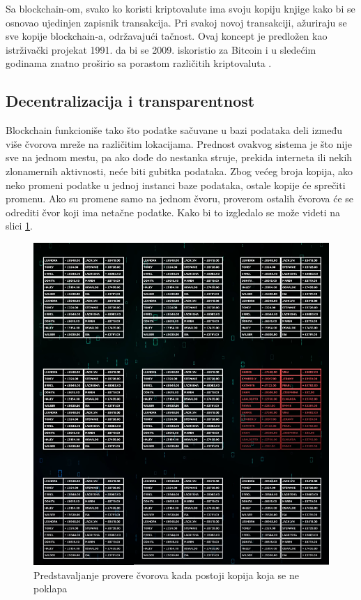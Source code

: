 \documentclass[a4paper]{article}
\begin{document}
{Sa blockchain-om, svako ko koristi kriptovalute ima svoju kopiju knjige kako bi se osnovao ujedinjen zapisnik transakcija. Pri svakoj novoj transakciji, ažuriraju se sve kopije blockchain-a, održavajući tačnost.\cite{kriptovalute2} Ovaj koncept je predložen kao istrživački projekat 1991. da bi se 2009. iskoristio za Bitcoin i u sledećim godinama znatno proširio sa porastom različitih kriptovaluta \cite{blockchain}.


\subsection{Decentralizacija i transparentnost}
\label{subsec:decentralizacija}
Blockchain funkcioniše tako što podatke sačuvane u bazi podataka deli između više čvorova mreže na različitim lokacijama. Prednost ovakvog sistema je što nije sve na jednom mestu, pa ako dođe do nestanka struje, prekida interneta ili nekih zlonamernih aktivnosti, neće biti gubitka podataka. Zbog većeg broja kopija, ako neko promeni podatke u jednoj instanci baze podataka, ostale kopije će sprečiti promenu. Ako su promene samo na jednom čvoru, proverom ostalih čvorova će se odrediti čvor koji ima netačne podatke. Kako bi to izgledalo se može videti na slici \ref{fig:proverakopija}.

\begin{figure}[h!]
\begin{center}
\includegraphics[scale=0.4]{slike/slika1.png}
\end{center}
\caption{Predstavaljanje provere čvorova kada postoji kopija koja se ne poklapa}
\label{fig:proverakopija}
\end{figure}

}
\end{document}
